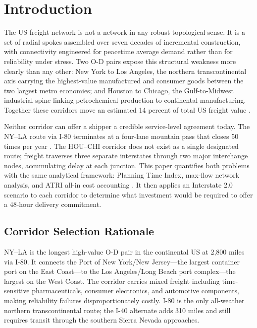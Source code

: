 \section{Introduction}
\label{sec:introduction}

The US freight network is not a network in any robust topological sense. It is a set of radial spokes assembled over seven decades of incremental construction, with connectivity engineered for peacetime average demand rather than for reliability under stress. Two O-D pairs expose this structural weakness more clearly than any other: New York to Los Angeles, the northern transcontinental axis carrying the highest-value manufactured and consumer goods between the two largest metro economies; and Houston to Chicago, the Gulf-to-Midwest industrial spine linking petrochemical production to continental manufacturing. Together these corridors move an estimated 14 percent of total US freight value \citep{FHWA_freight2023}.

Neither corridor can offer a shipper a credible service-level agreement today. The NY--LA route via I-80 terminates at a four-lane mountain pass that closes 50 times per year \citep{Caltrans2023}. The HOU--CHI corridor does not exist as a single designated route; freight traverses three separate interstates through two major interchange nodes, accumulating delay at each junction. This paper quantifies both problems with the same analytical framework: Planning Time Index, max-flow network analysis, and ATRI all-in cost accounting \citep{ATRI_costs2024}. It then applies an Interstate 2.0 scenario to each corridor to determine what investment would be required to offer a 48-hour delivery commitment.

\subsection{Corridor Selection Rationale}

NY--LA is the longest high-value O-D pair in the continental US at 2,800 miles via I-80. It connects the Port of New York/New Jersey---the largest container port on the East Coast---to the Los Angeles/Long Beach port complex---the largest on the West Coast. The corridor carries mixed freight including time-sensitive pharmaceuticals, consumer electronics, and automotive components, making reliability failures disproportionately costly. I-80 is the only all-weather northern transcontinental route; the I-40 alternate adds 310 miles and still requires transit through the southern Sierra Nevada approaches.


